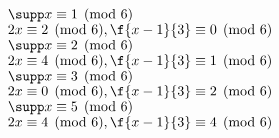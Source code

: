 \documentclass[12pt]{article}
\begin{document}
    $\supp x \equiv 1 \pmod 6$ \\
    $2x \equiv 2 \pmod 6, \f{x - 1}{3} \equiv 0 \pmod 6$ \\

    $\supp x \equiv 2 \pmod 6$ \\
    $2x \equiv 4 \pmod 6, \f{x - 1}{3} \equiv 1 \pmod 6$ \\

    $\supp x \equiv 3 \pmod 6$ \\
    $2x \equiv 0 \pmod 6, \f{x - 1}{3} \equiv 2 \pmod 6$ \\

    $\supp x \equiv 5 \pmod 6$ \\
    $2x \equiv 4 \pmod 6, \f{x - 1}{3} \equiv 4 \pmod 6$
\end{document}
